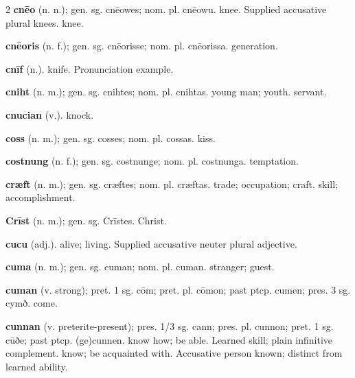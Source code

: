 \begin{multicols*}{2}
\textbf{cnēo} (n. n.); gen. sg. cnēowes; nom. pl. cnēowu. knee. Supplied accusative plural knees. knee.\par
\textbf{cnēoris} (n. f.); gen. sg. cnēorisse; nom. pl. cnēorissa. generation.\par
\textbf{cnīf} (n.). knife. Pronunciation example.\par
\textbf{cniht} (n. m.); gen. sg. cnihtes; nom. pl. cnihtas. young man; youth. servant.\par
\textbf{cnucian} (v.). knock.\par
\textbf{coss} (n. m.); gen. sg. cosses; nom. pl. cossas. kiss.\par
\textbf{costnung} (n. f.); gen. sg. costnunge; nom. pl. costnunga. temptation.\par
\textbf{cræft} (n. m.); gen. sg. cræftes; nom. pl. cræftas. trade; occupation; craft. skill; accomplishment.\par
\textbf{Crīst} (n. m.); gen. sg. Crīstes. Christ.\par
\textbf{cucu} (adj.). alive; living. Supplied accusative neuter plural adjective.\par
\textbf{cuma} (n. m.); gen. sg. cuman; nom. pl. cuman. stranger; guest.\par
\textbf{cuman} (v. strong); pret. 1 sg. cōm; pret. pl. cōmon; past ptcp. cumen; pres. 3 sg. cymð. come.\par
\textbf{cunnan} (v. preterite-present); pres. 1/3 sg. cann; pres. pl. cunnon; pret. 1 sg. cūðe; past ptcp. (ge)cunnen. know how; be able. Learned skill; plain infinitive complement. know; be acquainted with. Accusative person known; distinct from learned ability.\par

\end{multicols*}
